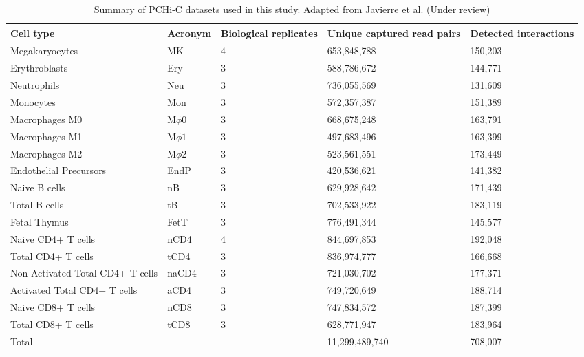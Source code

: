 {\begin{table}[ht]
\caption{Summary of PCHi-C datasets used in this study. Adapted from Javierre et al. (Under review)}
\centering
{\tabulinesep=1.2mm
\begin{tabular}{| L{3cm} | C{2cm} | C{2cm} | C{2.6cm} | C{2cm} | }
  \hline
 Cell type & Acronym & Biological replicates & Unique captured read pairs & Detected interactions \\
  \hline
 Megakaryocytes & MK &   4 & 653,848,788 & 150,203 \\
 Erythroblasts & Ery &   3 & 588,786,672 & 144,771 \\
 Neutrophils & Neu &   3 & 736,055,569 & 131,609 \\
 Monocytes & Mon &   3 & 572,357,387 & 151,389 \\
 Macrophages M0 & M$\phi0$ &   3 & 668,675,248 & 163,791 \\
 Macrophages M1 & M$\phi1$ &   3 & 497,683,496 & 163,399 \\
 Macrophages M2 & M$\phi2$ &   3 & 523,561,551 & 173,449 \\
 Endothelial Precursors & EndP &   3 & 420,536,621 & 141,382 \\
 Naive B cells & nB &   3 & 629,928,642 & 171,439 \\
 Total B cells & tB &   3 & 702,533,922 & 183,119 \\
 Fetal Thymus & FetT &   3 & 776,491,344 & 145,577 \\
 Naive CD4+ T cells & nCD4 &   4 & 844,697,853 & 192,048 \\
 Total CD4+ T cells & tCD4 &   3 & 836,974,777 & 166,668 \\
 Non-Activated Total CD4+ T cells & naCD4 &   3 & 721,030,702 & 177,371 \\
 Activated Total CD4+ T cells & aCD4 &   3 & 749,720,649 & 188,714 \\
 Naive CD8+ T cells & nCD8 &   3 & 747,834,572 & 187,399 \\
 Total CD8+ T cells & tCD8 &   3 & 628,771,947 & 183,964 \\
 \hline
 \hline
 Total & & & 11,299,489,740 & 708,007 \\
 \hline
\end{tabular}}
\label{tab:pints}
\end{table}
\addtocounter{footnote}{+1}
}
